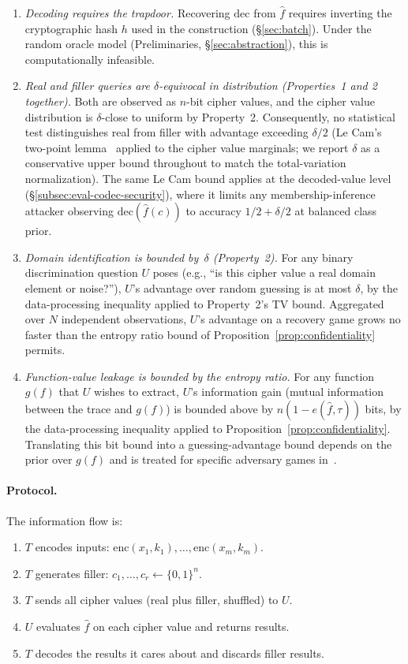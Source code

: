 \documentclass[11pt]{article}
\theoremstyle{definition}
\theoremstyle{plain}
\theoremstyle{remark}
\newcommand{\fhat}{\hat{f}}
\newcommand{\enc}{\mathrm{enc}}
\newcommand{\dec}{\mathrm{dec}}
\begin{document}
\begin{enumerate}
\item \emph{Decoding requires the trapdoor.}  Recovering $\dec$ from
    $\fhat$ requires inverting the cryptographic hash $h$ used in the
    construction (\S\ref{sec:batch}).  Under the random oracle model
    (Preliminaries, \S\ref{sec:abstraction}), this is computationally
    infeasible.
\item \emph{Real and filler queries are $\delta$-equivocal in
    distribution (Properties~1 and 2 together).}  Both are observed as
    $n$-bit cipher values, and the cipher value distribution is
    $\delta$-close to uniform by Property~2.  Consequently, no
    statistical test distinguishes real from filler with advantage
    exceeding $\delta/2$ (Le Cam's two-point
    lemma~\cite{lecam1986asymptotic} applied to the cipher value
    marginals; we report $\delta$ as a conservative upper bound
    throughout to match the total-variation normalization).  The same
    Le Cam bound applies at the decoded-value level
    (\S\ref{subsec:eval-codec-security}), where it limits any
    membership-inference attacker observing $\dec(\fhat(c))$ to
    accuracy $1/2 + \delta/2$ at balanced class prior.
\item \emph{Domain identification is bounded by~$\delta$ (Property~2).}
    For any binary discrimination question $U$ poses (e.g., ``is this
    cipher value a real domain element or noise?''), $U$'s advantage
    over random guessing is at most $\delta$, by the data-processing
    inequality applied to Property~2's TV bound.  Aggregated over $N$
    independent observations, $U$'s advantage on a recovery game grows
    no faster than the entropy ratio bound of
    Proposition~\ref{prop:confidentiality} permits.
\item \emph{Function-value leakage is bounded by the entropy ratio.}
    For any function $g(f)$ that $U$ wishes to extract, $U$'s
    information gain (mutual information between the trace and
    $g(f)$) is bounded above by $n(1 - e(\fhat, \tau))$ bits, by the
    data-processing inequality applied to
    Proposition~\ref{prop:confidentiality}.  Translating this bit
    bound into a guessing-advantage bound depends on the prior over
    $g(f)$ and is treated for specific adversary games
    in~\cite[\S 5--6]{towell2026maxconf}.
\end{enumerate}

\paragraph{Protocol.}
The information flow is:
\begin{enumerate}
\item $T$ encodes inputs: $\enc(x_1, k_1), \ldots, \enc(x_m, k_m)$.
\item $T$ generates filler: $c_1, \ldots, c_r \gets \{0,1\}^n$.
\item $T$ sends all cipher values (real plus filler, shuffled) to $U$.
\item $U$ evaluates $\fhat$ on each cipher value and returns results.
\item $T$ decodes the results it cares about and discards filler results.
\end{enumerate}
\end{document}
